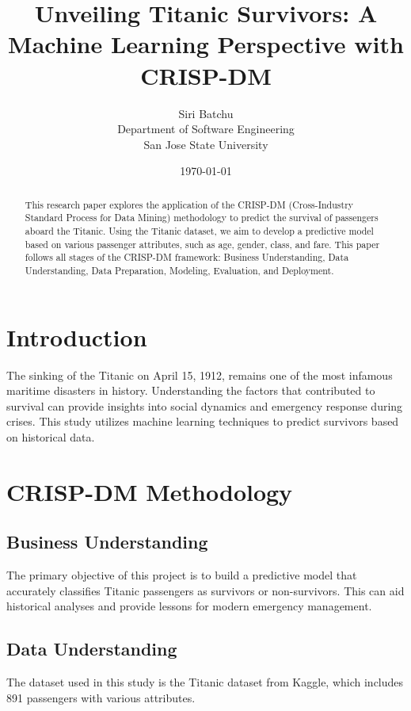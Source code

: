 \documentclass{article}
\title{Unveiling Titanic Survivors: A Machine Learning Perspective with CRISP-DM}
\author{ Siri Batchu \\ Department of Software Engineering \\ San Jose State University}
\date{\today}
\begin{document}
\maketitle

\begin{abstract}
This research paper explores the application of the CRISP-DM (Cross-Industry Standard Process for Data Mining) methodology to predict the survival of passengers aboard the Titanic. Using the Titanic dataset, we aim to develop a predictive model based on various passenger attributes, such as age, gender, class, and fare. This paper follows all stages of the CRISP-DM framework: Business Understanding, Data Understanding, Data Preparation, Modeling, Evaluation, and Deployment.
\end{abstract}

\section{Introduction}
The sinking of the Titanic on April 15, 1912, remains one of the most infamous maritime disasters in history. Understanding the factors that contributed to survival can provide insights into social dynamics and emergency response during crises. This study utilizes machine learning techniques to predict survivors based on historical data.

\section{CRISP-DM Methodology}


\subsection{Business Understanding}
The primary objective of this project is to build a predictive model that accurately classifies Titanic passengers as survivors or non-survivors. This can aid historical analyses and provide lessons for modern emergency management.


\subsection{Data Understanding}
The dataset used in this study is the Titanic dataset from Kaggle, which includes 891 passengers with various attributes.
\end{document}

